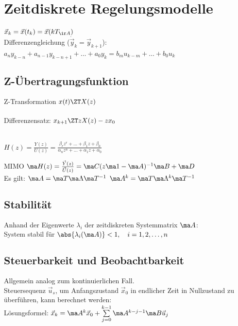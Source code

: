 \documentclass[german]{latex4ei/latex4ei_sheet}
\begin{document}
\section{Zeitdiskrete Regelungsmodelle}
\begin{sectionbox}
$\vec x_k = \vec x(t_k) = \vec x(k T_{\ir A})$\\

Differenzengleichung ($\dot{\vec y}_k = \vec y_{k+1}$):\\
$a_n y_{k-n} + a_{n-1} y_{k-n+1} + \ldots + a_0 y_k = b_m u_{k-m} + \ldots + b_0 u_k$

	\subsection{Z-Übertragungsfunktion}
	Z-Transformation $x(t) \ZT X(z)$\\
	\\
	Differenzensatz: $x_{k+1} \ZT z X(z) - z x_0$\\
	\\
	\begin{emphbox} $\displaystyle H(z) = \frac{Y(z)}{U(z)} = \frac{\beta_r z^r + \ldots + \beta_1 z + \beta_0}{\alpha_n z^n + \ldots + \alpha_1 z + \alpha_0}$ \end{emphbox}
	MIMO $\ma H(z) = \frac{\vec Y(z)}{\vec U(z)} = \ma C(z\ma 1 - \ma A)^{-1} \ma B + \ma D$\\
	Es gilt: $\ma A = \ma T \ma \Lambda \ma T^{-1}$ \qquad $\ma A^k = \ma T \ma \Lambda^k \ma T^{-1}$\\

	\subsection{Stabilität}
	Anhand der Eigenwerte $\lambda_i$ der zeitdiskreten Systemmatrix $\ma A$:\\
	System stabil für $\abs{\lambda_i(\ma A)} < 1, \quad i = 1, 2, \ldots, n$

	\subsection{Steuerbarkeit und Beobachtbarkeit}
	Allgemein analog zum kontinuierlichen Fall.\\
	Steuersequenz $\vec u_s$, um Anfangszustand $\vec x_0$ in endlicher Zeit in Nullzustand zu überführen, kann berechnet werden:\\
	Lösungsformel: $\vec x_k = \ma A^k \vec x_0 + \sum\limits_{j=0}^{k-1} \ma A^{k-j-1} \ma B \vec u_j$\\
\end{sectionbox}
\end{document}
